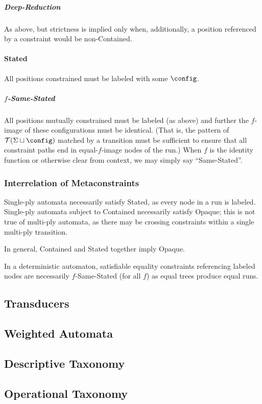 \subparagraph{Deep-Reduction} As above, but strictness is implied only when,
additionally, a position referenced by a constraint would be non-Contained.

\paragraph{Stated} All positions constrained must be labeled with some 
$\config$.

\subparagraph{$f$-Same-Stated} All positions mutually constrained must be
labeled (as above) and further the $f$-image of these configurations must be
identical.  (That is, the pattern of $\mathcal{T}(\Sigma \sqcup \config)$
matched by a transition must be sufficient to ensure that all constraint
paths end in equal-$f$-image nodes of the run.)  When $f$ is the identity
function or otherwise clear from context, we may simply say ``Same-Stated''.

\subsubsection{Interrelation of Metaconstraints}

Single-ply automata necessarily satisfy Stated, as every node in a run is
labeled.  Single-ply automata subject to Contained necessarily satisfy
Opaque; this is not true of multi-ply automata, as there may be crossing
constraints within a single multi-ply transition.

In general, Contained and Stated together imply Opaque.

In a deterministic automaton, satisfiable equality constraints referencing
labeled nodes are necessarily $f$-Same-Stated (for all $f$) as equal trees
produce equal runs.

\subsection{Transducers}

\subsection{Weighted Automata}

\subsection{Descriptive Taxonomy}

\subsection{Operational Taxonomy}
